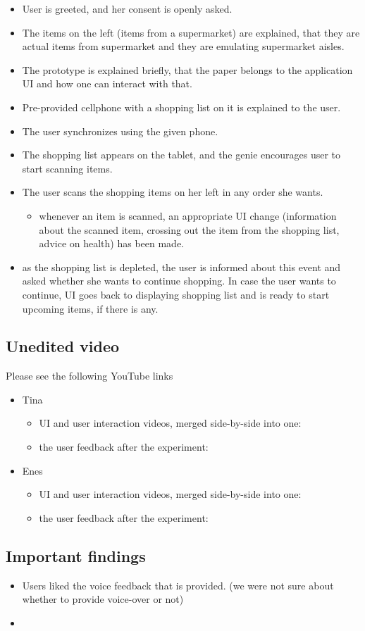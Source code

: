 \begin{itemize}
	\item User is greeted, and her consent is openly asked.
	\item The items on the left (items from a supermarket) are explained, that they are actual items from supermarket and they are emulating supermarket aisles.
	\item The prototype is explained briefly, that the paper belongs to the application UI and how one can interact with that.
	\item Pre-provided cellphone with a shopping list on it is explained to the user.
	\item The user synchronizes using the given phone.
	\item The shopping list appears on the tablet, and the genie encourages user to start scanning items.
	\item The user scans the shopping items on her left in any order she wants.
		\begin{itemize}
			\item whenever an item is scanned, an appropriate UI change (information about the scanned item, crossing out the item from the shopping list, advice on health) has been made.
		\end{itemize}
	\item as the shopping list is depleted, the user is informed about this event and asked whether she wants to continue shopping. In case the user wants to continue, UI goes back to displaying shopping list and is ready to start upcoming items, if there is any.
\end{itemize}

\subsection{Unedited video}
Please see the following YouTube links
\begin{itemize}
	\item Tina
		\begin{itemize}
			\item UI and user interaction videos, merged side-by-side into one:
			
			\item the user feedback after the experiment:
		\end{itemize}
	
	\item Enes
	\begin{itemize}
		\item UI and user interaction videos, merged side-by-side into one:
		
		\item the user feedback after the experiment:
	\end{itemize}
\end{itemize}

\subsection{Important findings}

	\begin{itemize}
		\item Users liked the voice feedback that is provided. (we were not sure about whether to provide voice-over or not)
		\item 
	\end{itemize}


